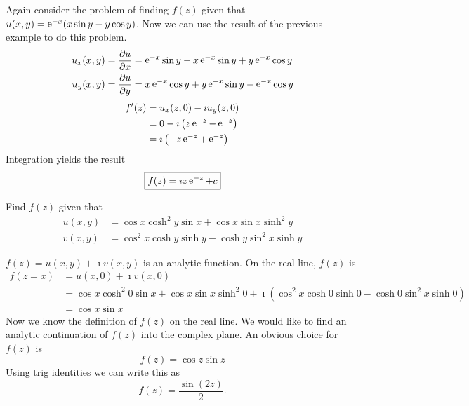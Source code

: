 \begin{Example}
  Again consider the problem of finding $f(z)$ given that
  $u(x, y) = \mathop{\mathrm{e}}\nolimits^{-x} (x \sin y - y \cos y )$.
  Now we can use the result of the previous example to do this problem.
  \begin{align*}
    u_x(x,y) &= \frac{\partial u}{\partial x} =
    \mathop{\mathrm{e}}\nolimits^{-x} \sin y - x \mathop{\mathrm{e}}\nolimits^{-x} \sin y + y \mathop{\mathrm{e}}\nolimits^{-x} \cos y 
    \\
    u_y(x,y) &= \frac{\partial u}{\partial y} = x \mathop{\mathrm{e}}\nolimits^{-x} \cos y + y \mathop{\mathrm{e}}\nolimits^{-x} \sin y 
    - \mathop{\mathrm{e}}\nolimits^{-x} \cos y
  \end{align*}
  \begin{align*}
    f'(z) &= u_x(z,0) - \imath u_y(z,0) 
    \\
    &= 0 - \imath \left( z \mathop{\mathrm{e}}\nolimits^{-z} - \mathop{\mathrm{e}}\nolimits^{-z} \right) 
    \\
    &= \imath \left( -z \mathop{\mathrm{e}}\nolimits^{-z} + \mathop{\mathrm{e}}\nolimits^{-z} \right)
  \end{align*}
  Integration yields the result
  \[
  \boxed{ 
    f(z) = \imath z\mathop{\mathrm{e}}\nolimits^{-z} + c 
    }
  \]
\end{Example}







\begin{Example}
  Find $f(z)$ given that
  \begin{align*}
    u(x,y)  &= \cos x \cosh^2 y \sin x + \cos x \sin x \sinh^2 y 
    \\
    v(x,y)  &= \cos^2 x \cosh y \sinh y - \cosh y \sin^2 x \sinh y
  \end{align*}

  \vspace{0.1in}
  $f(z) = u(x,y) + \imath v(x,y)$ is an analytic function.  On the real line,
  $f(z)$ is
  \begin{align*}
    f(z = x)  &= u(x,0) + \imath v(x,0) 
    \\
    &= \cos x \cosh^2 0 \sin x + \cos x \sin x \sinh^2 0
    + \imath \left( \cos^2 x \cosh 0 \sinh 0 - \cosh 0 \sin^2 x \sinh 0 \right) 
    \\
    &= \cos x \sin x
  \end{align*}
  Now we know the definition of $f(z)$ on the real line.  We would like to find
  an analytic continuation of $f(z)$ into the complex plane.  An obvious
  choice for $f(z)$ is
  \[
  f(z) = \cos z \sin z
  \]
  Using trig identities we can write this as
  \[
  \boxed{ 
    f(z) = \frac{\sin(2 z)}{2}. 
    }
  \]
\end{Example}





